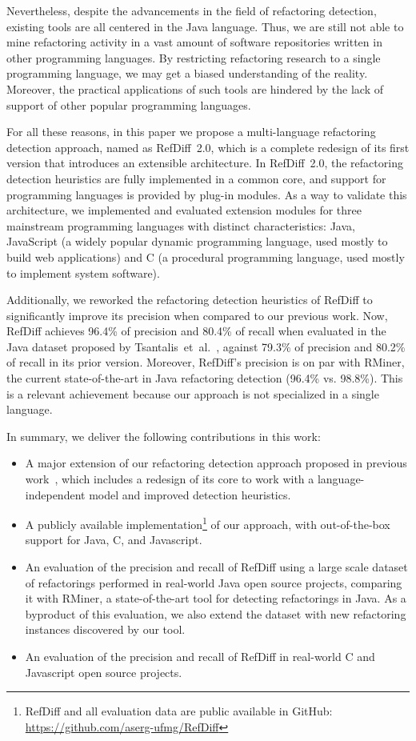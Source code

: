 Nevertheless, despite the advancements in the field of refactoring detection, existing tools are all centered in the Java language.
Thus, we are still not able to mine refactoring activity in a vast amount of software repositories written in other programming languages.
By restricting refactoring research to a single programming language, we may get a biased understanding of the reality.
Moreover, the practical applications of such tools are hindered by the lack of support of other popular programming languages.

For all these reasons, in this paper we propose a multi-language refactoring detection approach, named as RefDiff~2.0, which is a complete redesign of its first version that introduces an extensible architecture.
In RefDiff~2.0, the refactoring detection heuristics are fully implemented in a common core, and support for programming languages is provided by plug-in modules.
As a way to validate this architecture, we implemented and evaluated extension modules for three mainstream programming languages with distinct characteristics: Java, JavaScript (a widely popular dynamic programming language, used mostly to build web applications) and C (a procedural programming language, used mostly to implement system software).

Additionally, we reworked the refactoring detection heuristics of RefDiff to significantly improve its precision when compared to our previous work.
Now, RefDiff achieves 96.4\% of precision and 80.4\% of recall when evaluated in the Java dataset proposed by Tsantalis~et~al.~\cite{tsantalis2018rminer}, against 79.3\% of precision and 80.2\% of recall in its prior version.
Moreover, RefDiff's precision is on par with RMiner, the current state-of-the-art in Java refactoring detection (96.4\% vs. 98.8\%).
This is a relevant achievement because our approach is not specialized in a single language.

In summary, we deliver the following contributions in this work:
\begin{itemize}
\item A major extension of our refactoring detection approach proposed in previous work~\cite{msr2017}, which includes a redesign of its core to work with a language-independent model and improved detection heuristics.
\item A publicly available implementation\footnote{RefDiff and all evaluation data are public available in GitHub:\\
\url{https://github.com/aserg-ufmg/RefDiff}}
of our approach, with out-of-the-box support for Java, C, and Javascript.
\item An evaluation of the precision and recall of RefDiff using a large scale dataset of refactorings performed in real-world Java open source projects, comparing it with RMiner, a state-of-the-art tool for detecting refactorings in Java. As a byproduct of this evaluation, we also extend the dataset with new refactoring instances discovered by our tool.
\item An evaluation of the precision and recall of RefDiff in real-world C and Javascript open source projects.
\end{itemize}

